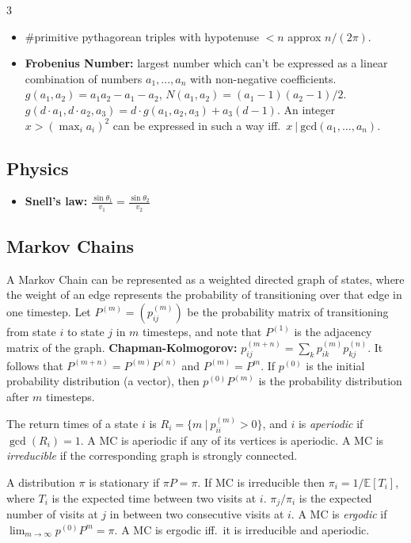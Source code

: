 \documentclass[a4paper, 8pt, landscape, oneside]{extarticle}
\begin{document}
\begin{multicols*}{3}
\begin{itemize}[leftmargin=*]
          \item \#primitive pythagorean triples with hypotenuse $<n$ approx $n/(2\pi)$.
          \item \textbf{Frobenius Number:} largest number which can't be
            expressed as a linear combination of numbers $a_1,\ldots,a_n$
            with non-negative coefficients. $g(a_1,a_2) = a_1a_2-a_1-a_2$,
            $N(a_1,a_2)=(a_1-1)(a_2-1)/2$. $g(d\cdot a_1,d\cdot a_2,a_3) =
            d\cdot g(a_1,a_2,a_3) + a_3(d-1)$. An integer $x>\left(\max_i
            a_i\right)^2$ can be expressed in such a way iff.\ $x\ |\
            \mathrm{gcd}(a_1,\ldots,a_n)$.
        \end{itemize}
      
        \subsection{Physics}
          \begin{itemize}
            \item \textbf{Snell's law:} $\frac{\sin\theta_1}{v_1} = \frac{\sin\theta_2}{v_2}$
          \end{itemize}
      
        \subsection{Markov Chains}
          A Markov Chain can be represented as a weighted directed graph of
          states, where the weight of an edge represents the probability of
          transitioning over that edge in one timestep. Let $P^{(m)} = (p^{(m)}_{ij})$
          be the probability matrix of transitioning from state $i$ to state $j$
          in $m$ timesteps, and note that $P^{(1)}$ is the adjacency matrix of
          the graph. \textbf{Chapman-Kolmogorov:} $p^{(m+n)}_{ij} = \sum_{k}
          p^{(m)}_{ik} p^{(n)}_{kj}$. It follows that $P^{(m+n)} =
          P^{(m)}P^{(n)}$ and $P^{(m)} = P^m$. If $p^{(0)}$ is the initial
          probability distribution (a vector), then $p^{(0)}P^{(m)}$ is the
          probability distribution after $m$ timesteps.
      
          The return times of a state $i$ is $R_i = \{m\ |\ p^{(m)}_{ii} > 0 \}$,
          and $i$ is \textit{aperiodic} if $\gcd(R_i) = 1$. A MC is aperiodic if
          any of its vertices is aperiodic. A MC is \textit{irreducible} if the
          corresponding graph is strongly connected.
      
          A distribution $\pi$ is stationary if $\pi P = \pi$. If MC is
          irreducible then $\pi_i = 1/\mathbb{E}[T_i]$, where $T_i$ is the
          expected time between two visits at $i$. $\pi_j/\pi_i$ is the expected
          number of visits at $j$ in between two consecutive visits at $i$. A MC
          is \textit{ergodic} if $\lim_{m\to\infty} p^{(0)} P^{m} = \pi$. A MC is
          ergodic iff.\ it is irreducible and aperiodic.
      

\end{multicols*}
\end{document}
